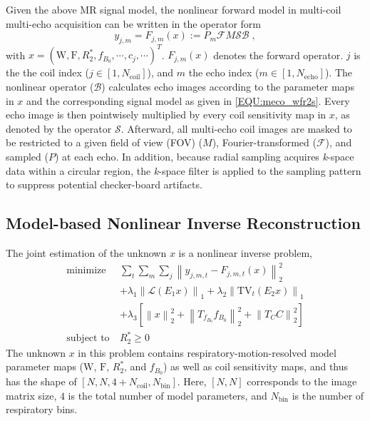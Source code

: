 \documentclass[journal,twoside,web]{ieeecolor}
\newcommand*{\norm}[1]{\left\lVert#1\right\rVert}
\begin{document}
Given the above MR signal model, the nonlinear forward model in multi-coil multi-echo acquisition 
can be written in the operator form 
\begin{equation} \label{EQU:op_fwd}
y_{j,m} = F_{j,m} (x) := P_m \mathcal{F} M \mathcal{S} \mathcal{B} \; ,
\end{equation}
with $x = (\text{W}, \text{F}, R_2^*, f_{B_0}, \cdots, c_j, \cdots)^T$. 
$F_{j,m} (x)$ denotes the forward operator.
$j$ is the the coil index ($j \in [1,N_\text{coil}]$), 
and $m$ the echo index ($m \in [1, N_\text{echo}]$). 
The nonlinear operator ($\mathcal{B}$) calculates echo images 
according to the parameter maps in $x$ and 
the corresponding signal model as given in \cref{EQU:meco_wfr2s}. 
Every echo image is then pointwisely multiplied by every coil sensitivity map in $x$, 
as denoted by the operator $\mathcal{S}$. 
Afterward, all multi-echo coil images are masked to be restricted to a given
field of view (FOV) ($M$), Fourier-transformed ($\mathcal{F}$), and sampled ($P$) at each echo.
In addition, because radial sampling acquires \textit{k}-space data within a circular region, 
the \textit{k}-space filter \cite{pruessmann_2001_gsense}
is applied to the sampling pattern to suppress potential checker-board artifacts.

\subsection{Model-based Nonlinear Inverse Reconstruction}

The joint estimation of the unknown $x$ is a nonlinear inverse problem,
\begin{equation} \label{EQU:obj_func}
\begin{aligned}
\text{minimize}~& \sum_t \sum_m \sum_j \norm{y_{j,m,t} - F_{j,m,t}(x)}_2^2 \\
& + \lambda_1 \norm{\mathcal{L} (E_1 x)}_1 + \lambda_2 \norm{\text{TV}_t (E_2 x)}_1 \\
& + \lambda_3 [ \norm{x}_2^2 + \norm{T_{f_{B_0}} f_{B_0}}_2^2 + \norm{T_C C}_2^2 ]\\
\text{subject to}~& {R_2^*} \geq 0
\end{aligned}
\end{equation}
The unknown $x$ in this problem contains respiratory-motion-resolved 
model parameter maps ($\text{W}$,  $\text{F}$, $R_2^*$, and $f_{B_0}$) 
as well as coil sensitivity maps, and thus has the shape of 
$[N, N, 4 + N_\text{coil}, N_\text{bin}]$. 
Here, $[N, N]$ corresponds to the image matrix size, 
$4$ is the total number of model parameters, 
and $N_\text{bin}$ is the number of respiratory bins.
\end{document}

